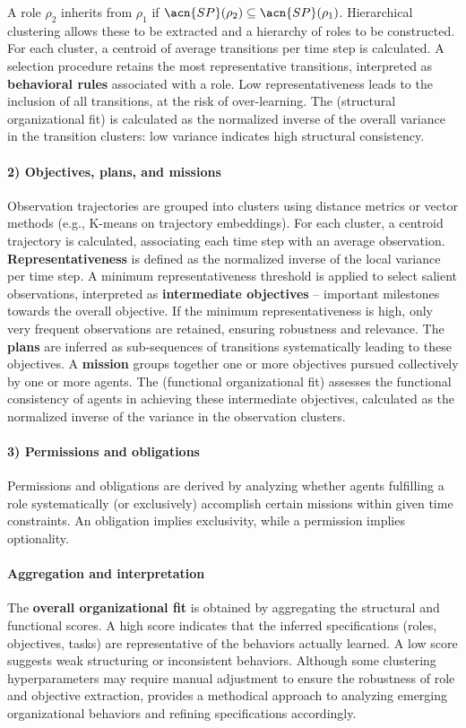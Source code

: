 A role $\rho_2$ inherits from $\rho_1$ if $\acn{SP}(\rho_2) \subseteq \acn{SP}(\rho_1)$.
Hierarchical clustering allows these  to be extracted and a hierarchy of roles to be constructed.
For each cluster, a centroid of average transitions per time step is calculated. A selection procedure retains the most representative transitions, interpreted as \textbf{behavioral rules} associated with a role.
Low representativeness leads to the inclusion of all transitions, at the risk of over-learning.
The \textbf{} (structural organizational fit) is calculated as the normalized inverse of the overall variance in the transition clusters: low variance indicates high structural consistency.

\paragraph{2) Objectives, plans, and missions}
Observation trajectories are grouped into clusters using distance metrics or vector methods (e.g., K-means on trajectory embeddings). For each cluster, a centroid trajectory is calculated, associating each time step with an average observation.
\textbf{Representativeness} is defined as the normalized inverse of the local variance per time step.
A minimum representativeness threshold is applied to select salient observations, interpreted as \textbf{intermediate objectives} – important milestones towards the overall objective.
If the minimum representativeness is high, only very frequent observations are retained, ensuring robustness and relevance.
The \textbf{plans} are inferred as sub-sequences of transitions systematically leading to these objectives.
A \textbf{mission} groups together one or more objectives pursued collectively by one or more agents.
The \textbf{} (functional organizational fit) assesses the functional consistency of agents in achieving these intermediate objectives, calculated as the normalized inverse of the variance in the observation clusters.

\paragraph{3) Permissions and obligations}
Permissions and obligations are derived by analyzing whether agents fulfilling a role systematically (or exclusively) accomplish certain missions within given time constraints.
An obligation implies exclusivity, while a permission implies optionality.

\paragraph{Aggregation and interpretation}
The \textbf{overall organizational fit} is obtained by aggregating the structural and functional scores.
A high score indicates that the inferred specifications (roles, objectives, tasks) are representative of the behaviors actually learned.
A low score suggests weak structuring or inconsistent behaviors.
Although some clustering hyperparameters may require manual adjustment to ensure the robustness of role and objective extraction,  provides a methodical approach to analyzing emerging organizational behaviors and refining specifications accordingly.


